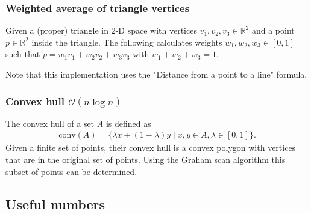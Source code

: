 \subsubsection{Weighted average of triangle vertices}
Given a (proper) triangle in $2$-D space with vertices $v_1, v_2, v_3 \in \mathbb R^2$ and a point $p \in \mathbb R^2$ inside the triangle. The following calculates weights $w_1, w_2, w_3 \in [0, 1]$ such that $p = w_1v_1 + w_2v_2 + w_3v_3$ with $w_1 + w_2 + w_3 = 1$.

Note that this implementation uses the "Distance from a point to a line" formula.

\subsubsection{Convex hull $\mathcal O(n \log n)$}
The convex hull of a set $A$ is defined as
\begin{align*}
    \text{conv}(A) = \{\lambda x + (1 - \lambda) y \mid x, y \in A, \lambda \in [0, 1]\}.
\end{align*}
Given a finite set of points, their convex hull is a convex polygon with vertices that are in the original set of points. Using the Graham scan algorithm this subset of points can be determined.



\subsection{Useful numbers}

